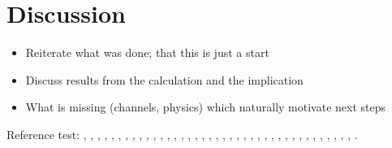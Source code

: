 \section{Discussion}
\label{sec:discussion}


\begin{itemize}
  \item Reiterate what was done; that this is just a start
  \item Discuss results from the calculation and the implication
  \item What is missing (channels, physics) which naturally motivate
    next steps
\end{itemize}

Reference test:
\cite{ArcherWest2003},
\cite{BarrettJolleyetal2010},
\cite{BuckwalterMankin1998},
\cite{CarneyMuir1988},
\cite{Chaetal2009},
\cite{Chuetal2006},
\cite{Clarketal2010},
\cite{Clarketal2011},
\cite{DartStanden1994},
\cite{Edwardsetal1994},
\cite{Fassbender1987},
\cite{Grishkoetal2010},
\cite{Halletal1996},
\cite{Hille2001},
\cite{HorriganAldrich2002},
\cite{LeeUrban1997},
\cite{LesageLazdunski2000},
\cite{Lewisetal2011},
\cite{Maleckaretal2009},
\cite{Mankin1982},
\cite{MillwardSadleretal2000},
\cite{Mobasherietal1997},
\cite{Mobasherietal2007},
\cite{Mobasherietal2005},
\cite{Mobasherietal1998},
\cite{Mowetal1999},
\cite{Nygrenetal1998},
\cite{Otte1991},
\cite{Poole1997},
\cite{RadhakrishnanHindmarsh1993},
\cite{Scholz2002},
\cite{Stein1990},
\cite{Stockwell1991},
\cite{Sugimotoetal1996},
\cite{Tsugaetal2001},
\cite{UNKNOWN},
\cite{Urban1994},
\cite{Walshetal1992},
\cite{Wilkinsetal2000},
\cite{Wuetal2007}.


